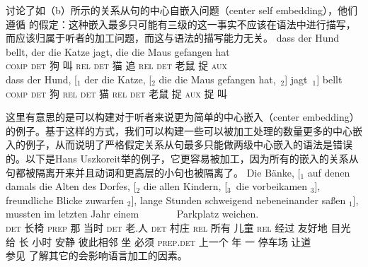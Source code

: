  \citet*{JBR2000a}讨论了如（b）所示的关系从句的中心自嵌入问题（center self embedding），他们遵循 \citet[]{CM63a}的假定：这种嵌入最多只可能有三级的这一事实不应该在语法中进行描写，而应该归属于听者的加工问题，而这与语法的描写能力无关。
\eal
\label{TAG-Beispiel-Performanz}
\ex 
\gll dass der Hund bellt, der  die Katze jagt,  die  die Maus  gefangen hat\\
     \textsc{comp} \textsc{det} 狗  叫  \textsc{rel} \textsc{det} 猫 追 \textsc{rel} \textsc{det} 老鼠 捉 \textsc{aux}   \\
\ex 
\gll dass der Hund, [$_1$ der  die Katze, [$_2$ die  die Maus  gefangen hat,~$_2$] jagt~$_1$] bellt\\
     \textsc{comp} \textsc{det} 狗  {}  \textsc{rel} \textsc{det} 猫 {} \textsc{rel} \textsc{det} 老鼠 捉 \textsc{aux}   捉 叫 \\
\zl

\noindent
这里有意思的是可以构建对于听者来说更为简单的中心嵌入（center embedding）的例子。基于这样的方式，我们可以构建一些可以被加工处理的数量更多的中心嵌入的例子，从而说明了严格假定关系从句最多只能做两级中心嵌入的语法是错误的。以下是Hans Uszkoreit举的例子，它更容易被加工，因为所有的嵌入的关系从句都被隔离开来并且动词和更高层的小句也被隔离了。
\ea
\gll Die Bänke, [$_1$ auf denen damals die Alten des Dorfes, [$_2$ die allen Kindern, [$_3$~die vorbeikamen $_3$], freundliche Blicke zuwarfen $_2$], 
lange Stunden schweigend nebeneinander saßen $_1$], mussten im letzten Jahr einem~~~~~~~ Parkplatz weichen.\\
\textsc{det} 长椅 {} \textsc{prep} 那 当时 \textsc{det} 老.人 \textsc{det} 村庄 {} \textsc{rel} 所有 儿童 \hspaceThis{[$_3$~}\textsc{rel} 经过 {} 友好地 目光 给 {}
长 小时 安静 彼此相邻 坐 {} 必须 \textsc{prep}.\textsc{det} 上一个 年 一 停车场 让道\\
\z
参见 了解其它的会影响语言加工的因素。

